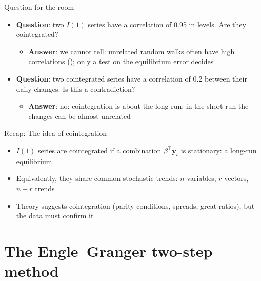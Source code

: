 \begin{frame}{Question for the room}
\itemsize{\small}
\begin{itemize}
    \item \textbf{Question}: two $I(1)$ series have a correlation of 0.95 in levels. Are they cointegrated?
    \begin{itemize}
        \item \textbf{Answer}: we cannot tell: unrelated random walks often have high correlations (); only a test on the equilibrium error decides
    \end{itemize}
    \item \textbf{Question}: two cointegrated series have a correlation of 0.2 between their daily changes. Is this a contradiction?
    \begin{itemize}
        \item \textbf{Answer}: no: cointegration is about the long run; in the short run the changes can be almost unrelated
    \end{itemize}
\end{itemize}
\end{frame}

\begin{frame}{Recap: The idea of cointegration}
\itemsize{\small}
\begin{itemize}
    \item $I(1)$ series are cointegrated if a combination $\beta^\top \mathbf y_t$ is stationary: a long-run equilibrium
    \item Equivalently, they share common stochastic trends: $n$ variables, $r$ vectors, $n - r$ trends
    \item Theory suggests cointegration (parity conditions, spreads, great ratios), but the data must confirm it
\end{itemize}
\end{frame}


\section{The Engle--Granger two-step method}

